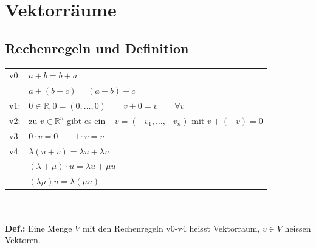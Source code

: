 \section{Vektorräume}

\subsection{Rechenregeln und Definition}
	\begin{tabular}{| l | l |}
		\hline v0: & $a + b = b + a$\\
			& $a + (b + c) = (a + b) + c$\\
		\hline v1: & $0 \in \mathbb{R}, 0 = (0, \ldots, 0) \qquad v + 0 = v \qquad \forall v$\\
		\hline v2: & zu $v \in \mathbb{R}^n$ gibt es ein $-v = (-v_1, \ldots, -v_n)$ \qquad mit $v + (-v) = 0$\\
		\hline v3: & $0 \cdot v = 0 \qquad 1 \cdot v = v$\\
		\hline v4: & $\lambda(u + v) = \lambda u + \lambda v$\\
			& $(\lambda + \mu) \cdot u = \lambda u + \mu u$\\
			& $(\lambda\mu)u = \lambda(\mu u)$\\
		\hline
	\end{tabular}\\ \\

	\textbf{Def.:} Eine Menge $V$ mit den Rechenregeln v0-v4 heisst Vektorraum, $v \in V$ heissen Vektoren.

